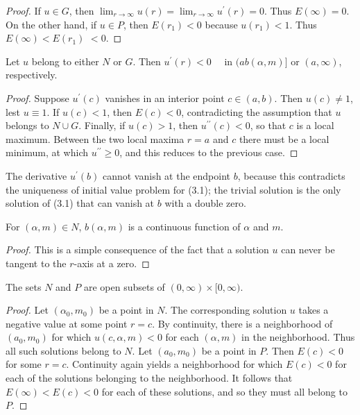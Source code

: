 \begin{proof}
  If $u \in G$, then $\lim _{r \rightarrow \infty} u(r)=\lim _{r \rightarrow \infty} u^{\prime}(r)=0$. Thus $E(\infty)=0$. On the other hand, if $u \in P$, then $E\left(r_1\right)<0$ because $u\left(r_1\right)<1$. Thus $E(\infty)<E\left(r_1\right)$ $<0$.
\end{proof}

\begin{lemma}\label{lemma:11}
  Let $u$ belong to either $N$ or $G$. Then $u^{\prime}(r)<0 \quad$ in $(a b(\alpha, m)]$ or $(a, \infty)$, respectively.
\end{lemma}

\begin{proof}
  Suppose $u^{\prime}(c)$ vanishes in an interior point $c \in(a, b)$. Then $u(c) \neq 1$, lest $u \equiv 1$. If $u(c)<1$, then $E(c)<0$, contradicting the assumption that $u$ belongs to $N \cup G$. Finally, if $u(c)>1$, then $u^{\prime \prime}(c)<0$, so that $c$ is a local maximum. Between the two local maxima $r=a$ and $c$ there must be a local minimum, at which $u^{\prime \prime} \geq 0$, and this reduces to the previous case.
\end{proof}

The derivative $u^{\prime}(b)$ cannot vanish at the endpoint $b$,
because this contradicts the uniqueness of initial value problem for (3.1);
the trivial solution is the only solution of (3.1) that can vanish at $b$
with a double zero.


\begin{lemma}\label{lemma:12}
  For $(\alpha, m) \in N$, $b(\alpha, m)$ is a continuous function of $\alpha$ and $m$.
\end{lemma}

\begin{proof}
  This is a simple consequence of the fact that a solution $u$ can never be tangent to the $r$-axis at a zero.
\end{proof}

\begin{lemma}\label{lemma:13}
  The sets $N$ and $P$ are open subsets of $(0, \infty) \times[0, \infty)$.
\end{lemma}

\begin{proof}
  Let $\left(\alpha_0, m_0\right)$ be a point in $N$. The corresponding solution $u$ takes a negative value at some point $r=c$. By continuity, there is a neighborhood of $\left(a_0, m_0\right)$ for which $u(c, \alpha, m)<0$ for each $(\alpha, m)$ in the neighborhood. Thus all such solutions belong to $N$. Let $\left(a_0, m_0\right)$ be a point in $P$. Then $E(c)<0$ for some $r=c$. Continuity again yields a neighborhood for which $E(c)<0$ for each of the solutions belonging to the neighborhood. It follows that $E(\infty)<E(c)<0$ for each of these solutions, and so they must all belong to $P$.
\end{proof}


